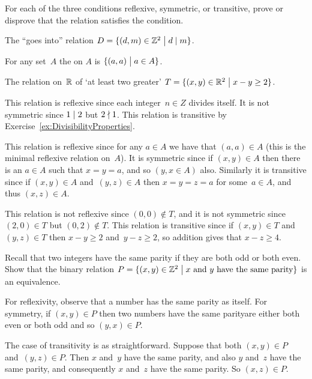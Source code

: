 \documentclass{test}  %
\begin{document}
\begin{ex} For each of the three conditions reflexive, symmetric, 
  or transitive,
  prove or disprove that the relation satisfies the condition.
\begin{exes}
\item The ``goes into'' relation
  $D=\{(d,m)\in\mathbb{Z}^2 \bigm| d\mid m\}$.
\item
  For any set~$A$ the  on $A$ 
  is $\{(a,a) \bigm| a\in A\}$. 
\item
  The relation on~$\mathbb{R}$ of `at least two greater'
  $T=\{(x,y)\in \mathbb{R}^2 \bigm| x-y\geq 2\}$.
\end{exes}
\begin{ans}
\begin{exes}
\item This relation is reflexive since each integer~$n\in Z$ 
  divides itself.
  It is not symmetric since $1\mid 2$ but $2\nmid 1$.
  This relation is transitive by Exercise~\ref{ex:DivisibilityProperties}.
\item This relation is reflexive since for any $a\in A$ we have that
  $(a,a)\in A$ (this is the minimal reflexive relation on~$A$).
  It is symmetric since if $(x,y)\in A$ then there is an
  $a\in A$ such that $x=y=a$, and so $(y,x\in A)$ also.
  Similarly it is transitive since if 
  $(x,y)\in A$ and~$(y,z)\in A$ then $x=y=z=a$ for some~$a\in A$, and
  thus $(x,z)\in A$.
\item This relation is not reflexive since $(0,0)\notin T$,
  and it is not symmetric since $(2,0)\in T$ but 
  $(0,2)\notin T$.
  This relation is transitive since if $(x,y)\in T$ and $(y,z)\in T$ 
  then $x-y\geq 2$ and~$y-z\geq 2$, so addition gives that $x-z\geq 4$.
\end{exes}
\end{ans}
\end{ex}

\begin{ex}
Recall that two integers have the same parity if they are both odd or 
both even.
Show that the binary relation 
$P=\{(x,y)\in\mathbb{Z}^2 \bigm| \text{$x$ and $y$ have the same parity}\}$  
is an equivalence.
\begin{ans}
For reflexivity, observe that a number has the same parity as itself.
For symmetry, if $(x,y)\in P$ then
two numbers have the same parity\Dash are either both even or both odd\Dash
and so $(y,x)\in P$.

The case of transitivity is as straightforward.
Suppose that both $(x,y)\in P$ and~$(y,z)\in P$.
Then $x$ and~$y$ have the same parity, and also $y$ and~$z$ have the same
parity, and consequently $x$ and~$z$ have the same parity.
So $(x,z)\in P$.  
\end{ans}
\end{ex}
\end{document}
